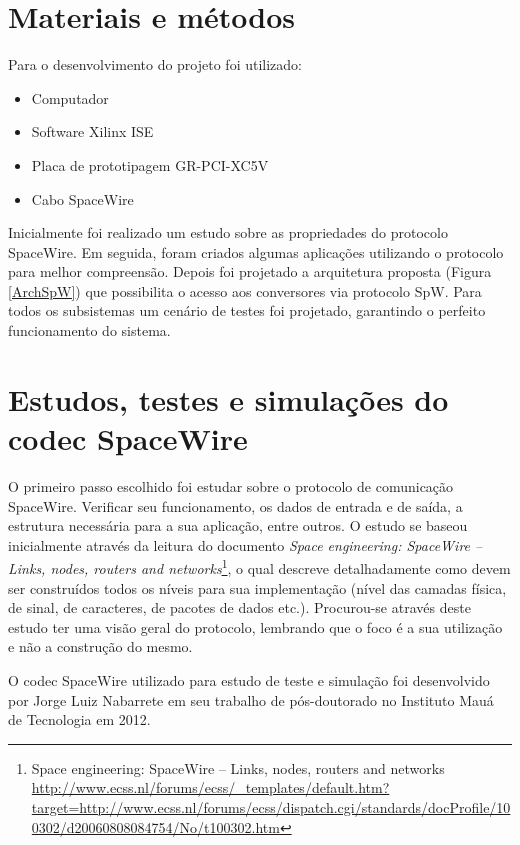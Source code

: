 \section{Materiais e métodos}
Para o desenvolvimento do projeto foi utilizado:

\begin{itemize}
	\item Computador
	\item Software Xilinx ISE
	\item Placa de prototipagem GR-PCI-XC5V
	\item Cabo SpaceWire
\end{itemize}

Inicialmente foi realizado um estudo sobre as propriedades do protocolo SpaceWire. Em seguida, foram criados algumas aplicações utilizando o protocolo para melhor compreensão. Depois foi projetado a arquitetura proposta (Figura \ref{ArchSpW}) que possibilita o acesso aos conversores via protocolo SpW. Para todos os subsistemas um cenário de testes foi projetado, garantindo o perfeito funcionamento do sistema.



\section{Estudos, testes e simulações do codec SpaceWire}

\let\thefootnote\svthefootnote
O primeiro passo escolhido foi estudar sobre o protocolo de comunicação SpaceWire. Verificar seu funcionamento, os dados de entrada e de saída, a estrutura necessária para a sua aplicação, entre outros. O estudo se baseou inicialmente através da leitura do documento \textit{Space engineering: SpaceWire – Links, nodes, routers and networks}\footnote{Space engineering: SpaceWire – Links, nodes, routers and networks \url{http://www.ecss.nl/forums/ecss/_templates/default.htm?target=http://www.ecss.nl/forums/ecss/dispatch.cgi/standards/docProfile/100302/d20060808084754/No/t100302.htm}}, o qual descreve detalhadamente como devem ser construídos todos os níveis para sua implementação (nível das camadas física, de sinal, de caracteres, de pacotes de dados etc.). Procurou-se através deste estudo ter uma visão geral do protocolo, lembrando que o foco é a sua utilização e não a construção do mesmo.

O codec SpaceWire utilizado para estudo de teste e simulação foi desenvolvido por Jorge Luiz Nabarrete em seu trabalho de pós-doutorado no Instituto Mauá de Tecnologia em 2012.


